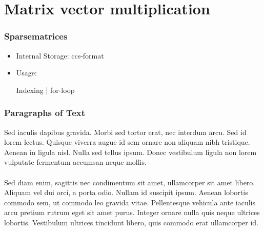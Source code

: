 \documentclass{beamer}
\begin{document}
\section{Matrix vector multiplication}


\begin{frame}
\frametitle{Sparsematrices}
\begin{itemize}
\item Internal Storage: ccs-format
\item Usage:
\begin{block}{Indexing | for-loop}
\codeA
\end{block}
\end{itemize}
\end{frame}







\begin{frame}
\frametitle{Paragraphs of Text}
Sed iaculis dapibus gravida. Morbi sed tortor erat, nec interdum arcu. Sed id lorem lectus. Quisque viverra augue id sem ornare non aliquam nibh tristique. Aenean in ligula nisl. Nulla sed tellus ipsum. Donec vestibulum ligula non lorem vulputate fermentum accumsan neque mollis.\\~\\

Sed diam enim, sagittis nec condimentum sit amet, ullamcorper sit amet libero. Aliquam vel dui orci, a porta odio. Nullam id suscipit ipsum. Aenean lobortis commodo sem, ut commodo leo gravida vitae. Pellentesque vehicula ante iaculis arcu pretium rutrum eget sit amet purus. Integer ornare nulla quis neque ultrices lobortis. Vestibulum ultrices tincidunt libero, quis commodo erat ullamcorper id.
\end{frame}

\end{document}
